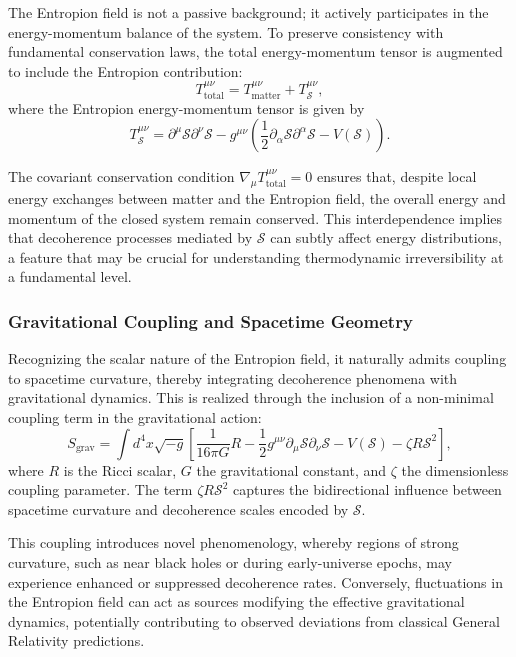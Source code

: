\documentclass[12pt]{article}
\begin{document}
The Entropion field is not a passive background; it actively participates in the energy-momentum balance of the system. To preserve consistency with fundamental conservation laws, the total energy-momentum tensor is augmented to include the Entropion contribution:
\begin{equation}
T^{\mu\nu}_\mathrm{total} = T^{\mu\nu}_\mathrm{matter} + T^{\mu\nu}_\mathcal{S},
\end{equation}
where the Entropion energy-momentum tensor is given by
\begin{equation}
T^{\mu\nu}_\mathcal{S} = \partial^\mu \mathcal{S} \partial^\nu \mathcal{S} - g^{\mu\nu} \left( \frac{1}{2} \partial_\alpha \mathcal{S} \partial^\alpha \mathcal{S} - V(\mathcal{S}) \right).
\end{equation}

The covariant conservation condition $\nabla_\mu T^{\mu\nu}_\mathrm{total} = 0$ ensures that, despite local energy exchanges between matter and the Entropion field, the overall energy and momentum of the closed system remain conserved. This interdependence implies that decoherence processes mediated by $\mathcal{S}$ can subtly affect energy distributions, a feature that may be crucial for understanding thermodynamic irreversibility at a fundamental level.

\subsubsection*{Gravitational Coupling and Spacetime Geometry}

Recognizing the scalar nature of the Entropion field, it naturally admits coupling to spacetime curvature, thereby integrating decoherence phenomena with gravitational dynamics. This is realized through the inclusion of a non-minimal coupling term in the gravitational action:
\begin{equation}
S_\mathrm{grav} = \int d^4x \sqrt{-g} \left[ \frac{1}{16\pi G} R - \frac{1}{2} g^{\mu\nu} \partial_\mu \mathcal{S} \partial_\nu \mathcal{S} - V(\mathcal{S}) - \zeta R \mathcal{S}^2 \right],
\end{equation}
where $R$ is the Ricci scalar, $G$ the gravitational constant, and $\zeta$ the dimensionless coupling parameter. The term $\zeta R \mathcal{S}^2$ captures the bidirectional influence between spacetime curvature and decoherence scales encoded by $\mathcal{S}$.

This coupling introduces novel phenomenology, whereby regions of strong curvature, such as near black holes or during early-universe epochs, may experience enhanced or suppressed decoherence rates. Conversely, fluctuations in the Entropion field can act as sources modifying the effective gravitational dynamics, potentially contributing to observed deviations from classical General Relativity predictions.
\end{document}
